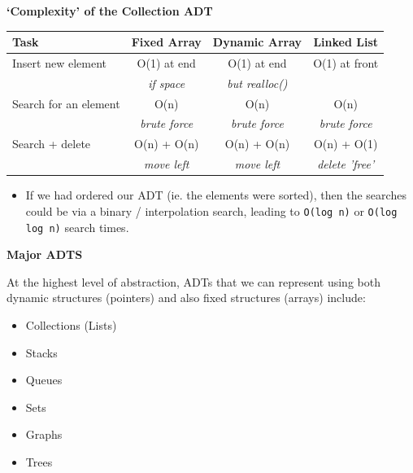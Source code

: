 \documentclass[a4,portraitt]{slides}
\begin{document}
\newpage
{\samepage
\begin{center}
{\large{\bf `Complexity' of the Collection ADT}}
\\[1in]
{\small
\begin{tabular}{|l|c|c|c|}\hline
Task                 & Fixed Array      & Dynamic Array      & Linked List        \\\hline
Insert new element   & O(1) at end      & O(1) at end        & O(1) at front      \\
                     & {\em if space}   & {\em but realloc()}&                    \\\hline
Search for an element& O(n)             & O(n)               & O(n)               \\
                     & {\em brute force}& {\em brute force}  & {\em brute force}  \\\hline
Search + delete      & O(n) + O(n)      & O(n) + O(n)        & O(n) + O(1)        \\
                     & {\em move left}  & {\em move left}    & {\em delete 'free'}\\\hline
\end{tabular}
}
\end{center}
\begin{itemize}
\item If we had ordered our ADT (ie. the elements were sorted), then the searches could be via a
binary / interpolation search, leading to \verb^O(log n)^ or \verb^O(log log n)^ search times.
\end{itemize}
}

\newpage
{\samepage
\begin{center}
{\Large{\bf Major ADTS}}
\end{center}
At the highest level of abstraction, ADTs that we can represent
using both dynamic structures (pointers) and also fixed structures (arrays) include:
\begin{itemize}
\item Collections (Lists)
\item Stacks
\item Queues
\item Sets
\item Graphs
\item Trees
\end{itemize}
}

\end{document}

